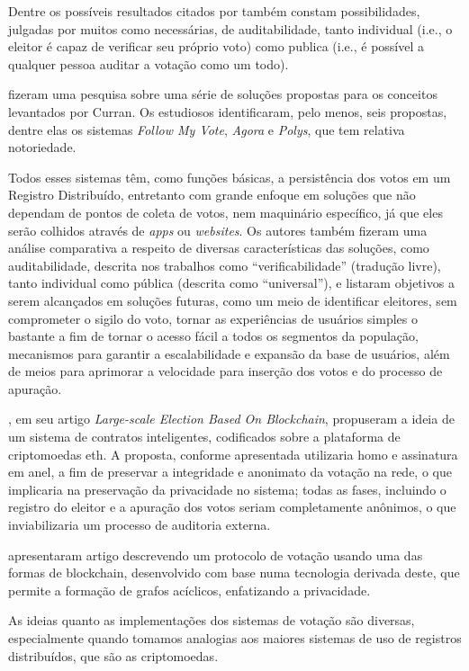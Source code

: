 Dentre os possíveis resultados citados por  também constam possibilidades, julgadas por muitos como necessárias, de auditabilidade, tanto individual (i.e., o eleitor é capaz de verificar seu próprio voto) como publica (i.e., é possível a qualquer pessoa auditar a votação como um todo).  

 fizeram uma pesquisa sobre uma série de soluções propostas para os conceitos levantados por Curran. Os estudiosos identificaram, pelo menos, seis propostas, dentre elas os sistemas \textit{Follow My Vote}, \textit{Agora} e \textit{Polys}, que tem relativa notoriedade. 

Todos esses sistemas têm, como funções básicas, a persistência dos votos em um Registro Distribuído, entretanto com grande enfoque em soluções que não dependam de pontos de coleta de votos, nem maquinário específico, já que eles serão colhidos através de \textit{apps} ou \textit{websites}. Os autores também fizeram uma análise comparativa a respeito de diversas características das soluções, como auditabilidade, descrita nos trabalhos como “verificabilidade” (tradução livre), tanto individual como pública (descrita como “universal”), e listaram objetivos a serem alcançados em soluções futuras, como um meio de identificar eleitores, sem comprometer o sigilo do voto, tornar as experiências de usuários simples o bastante a fim de tornar o acesso fácil a todos os segmentos da população, mecanismos para garantir a escalabilidade e expansão da base de usuários, além de meios para aprimorar a velocidade para inserção dos votos e do processo de apuração.  

, em seu artigo \textit{Large-scale Election Based On Blockchain}, propuseram a ideia de um sistema de contratos inteligentes, codificados sobre a plataforma de criptomoedas \gls{eth}. A proposta, conforme apresentada utilizaria \gls{homo} e assinatura em anel, a fim de preservar a integridade e anonimato da votação na rede, o que implicaria na preservação da privacidade no sistema; todas as fases, incluindo o registro do eleitor e a apuração dos votos seriam completamente anônimos, o que inviabilizaria um processo de auditoria externa. 

 apresentaram artigo descrevendo um protocolo de votação usando uma das formas de blockchain, desenvolvido com base numa tecnologia derivada deste, que permite a formação de grafos acíclicos, enfatizando a privacidade.  

As ideias quanto as implementações dos sistemas de votação são diversas, especialmente quando tomamos analogias aos maiores sistemas de uso de registros distribuídos, que são as criptomoedas. 

